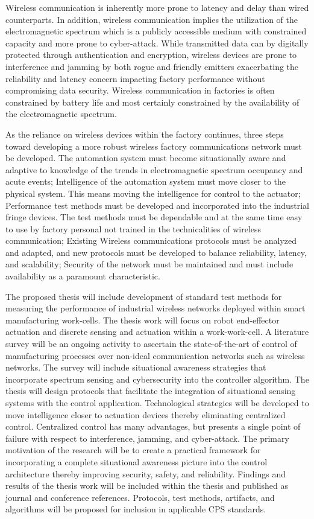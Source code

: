 Wireless communication is inherently more prone to latency and delay than wired counterparts.  In addition, wireless communication implies the utilization of the electromagnetic spectrum which is a publicly accessible medium with constrained capacity and more prone to cyber-attack.  While transmitted data can by digitally protected through authentication and encryption, wireless devices are prone to interference and jamming by both rogue and friendly emitters exacerbating the reliability and latency concern impacting factory performance without compromising data security.  Wireless communication in factories is often constrained by battery life and most certainly constrained by the availability of the electromagnetic spectrum.   

As the reliance on wireless devices within the factory continues, three steps toward developing a more robust wireless factory communications network must be developed. The automation system must become situationally aware and adaptive to knowledge of the trends in electromagnetic spectrum occupancy and acute events; Intelligence of the automation system must move closer to the physical system.  This means moving the intelligence for control to the actuator; Performance test methods must be developed and incorporated into the industrial fringe devices.  The test methods must be dependable and at the same time easy to use by factory personal not trained in the technicalities of wireless communication; Existing Wireless communications protocols must be analyzed and adapted, and new protocols must be developed to balance reliability, latency, and scalability; Security of the network must be maintained and must include availability as a paramount characteristic.

The proposed thesis will include development of standard test methods for measuring the performance of industrial wireless networks deployed within smart manufacturing work-cells.  The thesis work will focus on robot end-effector actuation and discrete sensing and actuation within a work-work-cell.  A literature survey will be an ongoing activity to ascertain the state-of-the-art of control of manufacturing processes over non-ideal communication networks such as wireless networks.  The survey will include situational awareness strategies that incorporate spectrum sensing and cybersecurity into the controller algorithm.  The thesis will design protocols that facilitate the integration of situational sensing systems with the control application.  Technological strategies will be developed to move intelligence closer to actuation devices thereby eliminating centralized control.  Centralized control has many advantages, but presents a single point of failure with respect to interference, jamming, and cyber-attack.  The primary motivation of the research will be to create a practical framework for incorporating a complete situational awareness picture into the control architecture thereby improving security, safety, and reliability.   Findings and results of the thesis work will be included within the thesis and published as journal and conference references.  Protocols, test methods, artifacts, and algorithms will be proposed for inclusion in applicable CPS standards. 

